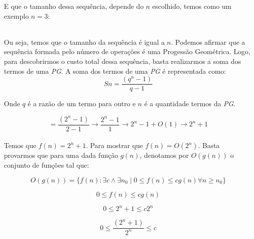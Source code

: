 \documentclass[a4paper, 12pt]{article}
\begin{document}
E que o tamanho dessa sequência, depende do $n$ escolhido, temos como um exemplo $n=3$: \\

 \\

Ou seja, temos que o tamanho da sequência é igual a $n$. Podemos afirmar que a sequência formada pelo número de operações é uma Progessão Geométrica. Logo, para descobrirmos o custo total dessa sequência, basta realizarmos a soma dos termos de uma {\it PG}. A soma dos termos de uma {\it PG} é representada como:
\begin{equation}
Sn = \dfrac{(q^{n}-1)}{q-1}
\end{equation}

Onde $q$ é a razão de um termo para outro e $n$ é a quantidade termos da {\it PG}.

\begin{equation}
= \dfrac{(2^{n}-1)}{2-1} \rightarrow \dfrac{2^{n}-1}{1} \rightarrow 2^{n}-1 + O(1) \rightarrow 2^{n}+1
\end{equation}\\

Temos que $f(n)=2^n+1$. Para mostrar que $f(n)=O(2^n)$. Basta provarmos que para uma dada função $g(n)$, denotamos por $O(g(n))$ o conjunto de funções
tal que: 

\begin{equation}
O(g(n)) = \{f(n) : \exists c \wedge \exists n_0 \mid 0 \leq f(n) \leq cg(n) \forall n \geq n_0 \}
\end{equation}

\begin{equation}
0 \leq f(n) \leq cg(n)
\end{equation}

\begin{equation}
0 \leq 2^n+1 \leq c2^n
\end{equation}

\begin{equation}
0 \leq \frac{(2^n+1)}{2^n} \leq c
\end{equation}
\end{document}
